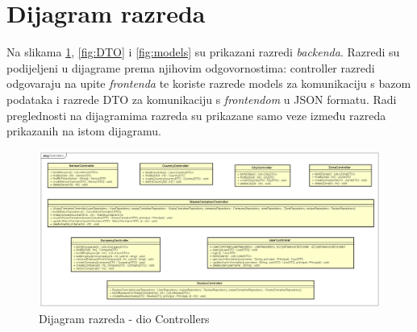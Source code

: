 			\eject
			
			
		\section{Dijagram razreda}
		
			Na slikama \ref{fig:controllers}, \ref{fig:DTO} i \ref{fig:models} su prikazani razredi \textit{backenda}.
			Razredi su podijeljeni u dijagrame prema njihovim odgovornostima: controller razredi odgovaraju na upite \textit{frontenda} te koriste razrede models za komunikaciju s bazom podataka i razrede DTO  za komunikaciju s \textit{frontendom} u JSON formatu.
			Radi preglednosti na dijagramima razreda su prikazane samo veze između razreda prikazanih na istom dijagramu.
		
			
			\begin{figure}[H]
				\includegraphics[width=1.0\linewidth]{slike/Controllers.png}
				\centering
				\caption{Dijagram razreda - dio Controllers}
				\label{fig:controllers}
			\end{figure}
		
